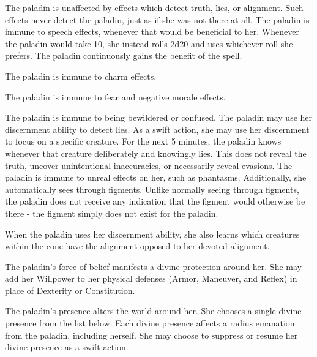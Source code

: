 The paladin is unaffected by effects which detect truth, lies, or alignment.
Such effects never detect the paladin, just as if she was not there at all.
The paladin is immune to speech effects, whenever that would be beneficial to her.
Whenever the paladin would take 10, she instead rolls 2d20 and uses whichever roll she prefers.
 The paladin continuously gains the benefit of the 
spell.

The paladin is immune to charm effects.

The paladin is immune to fear and negative morale effects.

The paladin is immune to being bewildered or confused.
The paladin may use her discernment ability to detect lies.
As a swift action, she may use her discernment to focus on a specific creature.
For the next 5 minutes, the paladin knows whenever that creature deliberately and knowingly lies.
This does not reveal the truth, uncover unintentional inaccuracies, or necessarily reveal evasions.
The paladin is immune to unreal effects on her, such as phantasms.
Additionally, she automatically sees through figments.
Unlike normally seeing through figments, the paladin does not receive any indication that the figment would otherwise be there - the figment simply does not exist for the paladin.

When the paladin uses her discernment ability, she also learns which creatures within the cone have the alignment opposed to her devoted alignment.

The paladin's force of belief manifests a divine protection around her.
She may add her Willpower to her physical defenses (Armor, Maneuver, and Reflex) in place of Dexterity or Constitution.

The paladin's presence alters the world around her.
She chooses a single divine presence from the list below.
Each divine presence affects a \arealarge radius emanation from the paladin, including herself.
She may choose to suppress or resume her divine presence as a swift action.

